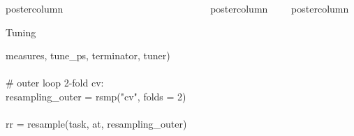 \documentclass{beamer}
\newlength{\columnheight} %
\begin{document}
\begin{frame}[fragile]{}
\begin{columns}
\begin{column}{.245\textwidth}
\begin{beamercolorbox}[center]{postercolumn}
\begin{minipage}{.98\textwidth}
{\begin{myblock}{Tuning}
\begin{codeboxexample}
{                \hspace*{1ex} measures, tune\_ps, terminator, tuner)\\
                \ \\
                \# outer loop 2-fold cv:\\
                resampling\_outer = rsmp("cv", folds = 2)\\
                \ \\
                rr = resample(task, at, resampling\_outer)}
					    \end{codeboxexample}
            \end{myblock}
						\vfill}
        \end{minipage}
			\end{beamercolorbox}
		\end{column}
    \begin{column}{.245\textwidth}
			\begin{beamercolorbox}[center]{postercolumn}
				\begin{minipage}{.98\textwidth}
					\parbox[t][\columnheight]{\textwidth}{
            \begin{myblock}{}
            \end{myblock}
						\vfill}
        \end{minipage}
			\end{beamercolorbox}
		\end{column}
    \begin{column}{.245\textwidth}
			\begin{beamercolorbox}[center]{postercolumn}
				\begin{minipage}{.98\textwidth}
					\parbox[t][\columnheight]{\textwidth}{
            \begin{myblock}{}
            \end{myblock}
						\vfill}
        \end{minipage}
			\end{beamercolorbox}
		\end{column}
	\end{columns}
\end{frame}
\end{document}
